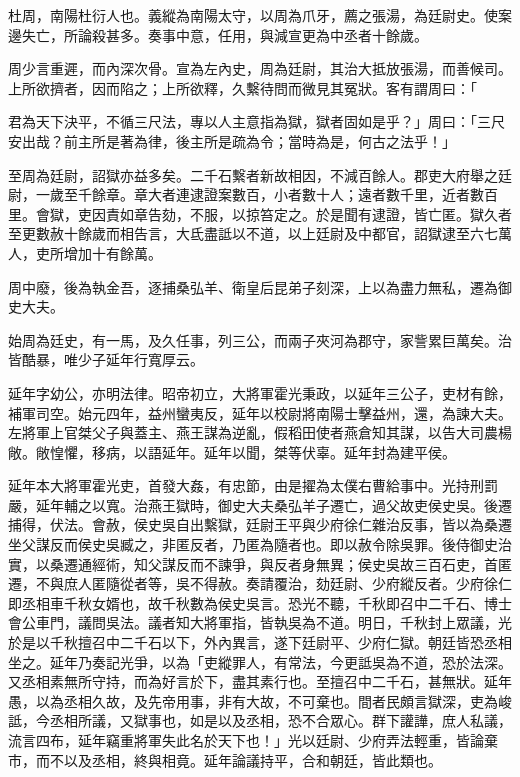 
\begin{pinyinscope}
杜周，南陽杜衍人也。義縱為南陽太守，以周為爪牙，薦之張湯，為廷尉史。使案邊失亡，所論殺甚多。奏事中意，任用，與減宣更為中丞者十餘歲。

周少言重遲，而內深次骨。宣為左內史，周為廷尉，其治大抵放張湯，而善候司。上所欲擠者，因而陷之；上所欲釋，久繫待問而微見其冤狀。客有謂周曰：「

君為天下決平，不循三尺法，專以人主意指為獄，獄者固如是乎？」周曰：「三尺安出哉？前主所是著為律，後主所是疏為令；當時為是，何古之法乎！」

至周為廷尉，詔獄亦益多矣。二千石繫者新故相因，不減百餘人。郡吏大府舉之廷尉，一歲至千餘章。章大者連逮證案數百，小者數十人；遠者數千里，近者數百里。會獄，吏因責如章告劾，不服，以掠笞定之。於是聞有逮證，皆亡匿。獄久者至更數赦十餘歲而相告言，大氐盡詆以不道，以上廷尉及中都官，詔獄逮至六七萬人，吏所增加十有餘萬。

周中廢，後為執金吾，逐捕桑弘羊、衛皇后昆弟子刻深，上以為盡力無私，遷為御史大夫。

始周為廷史，有一馬，及久任事，列三公，而兩子夾河為郡守，家訾累巨萬矣。治皆酷暴，唯少子延年行寬厚云。

延年字幼公，亦明法律。昭帝初立，大將軍霍光秉政，以延年三公子，吏材有餘，補軍司空。始元四年，益州蠻夷反，延年以校尉將南陽士擊益州，還，為諫大夫。左將軍上官桀父子與蓋主、燕王謀為逆亂，假稻田使者燕倉知其謀，以告大司農楊敞。敞惶懼，移病，以語延年。延年以聞，桀等伏辜。延年封為建平侯。

延年本大將軍霍光吏，首發大姦，有忠節，由是擢為太僕右曹給事中。光持刑罰嚴，延年輔之以寬。治燕王獄時，御史大夫桑弘羊子遷亡，過父故吏侯史吳。後遷捕得，伏法。會赦，侯史吳自出繫獄，廷尉王平與少府徐仁雜治反事，皆以為桑遷坐父謀反而侯史吳臧之，非匿反者，乃匿為隨者也。即以赦令除吳罪。後侍御史治實，以桑遷通經術，知父謀反而不諫爭，與反者身無異；侯史吳故三百石吏，首匿遷，不與庶人匿隨從者等，吳不得赦。奏請覆治，劾廷尉、少府縱反者。少府徐仁即丞相車千秋女婿也，故千秋數為侯史吳言。恐光不聽，千秋即召中二千石、博士會公車門，議問吳法。議者知大將軍指，皆執吳為不道。明日，千秋封上眾議，光於是以千秋擅召中二千石以下，外內異言，遂下廷尉平、少府仁獄。朝廷皆恐丞相坐之。延年乃奏記光爭，以為「吏縱罪人，有常法，今更詆吳為不道，恐於法深。又丞相素無所守持，而為好言於下，盡其素行也。至擅召中二千石，甚無狀。延年愚，以為丞相久故，及先帝用事，非有大故，不可棄也。間者民頗言獄深，吏為峻詆，今丞相所議，又獄事也，如是以及丞相，恐不合眾心。群下讙譁，庶人私議，流言四布，延年竊重將軍失此名於天下也！」光以廷尉、少府弄法輕重，皆論棄市，而不以及丞相，終與相竟。延年論議持平，合和朝廷，皆此類也。


\end{pinyinscope}
